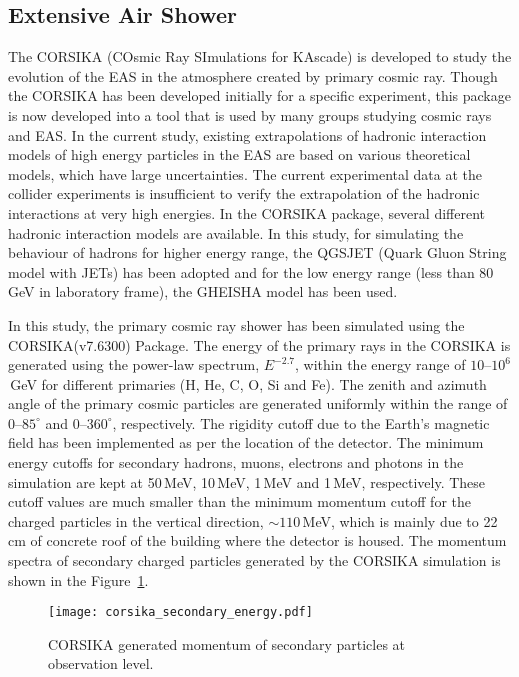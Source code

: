 \subsection{Extensive Air Shower}
The CORSIKA (COsmic Ray SImulations for KAscade) is developed to study
the evolution of the EAS in the atmosphere created by primary cosmic
ray. Though the CORSIKA has been developed initially for a specific
experiment, this package is now developed into a tool that is used
by many groups studying cosmic rays and EAS.
In the current study, existing extrapolations of hadronic interaction
models of high energy particles in the EAS are based on
various theoretical models, which have large uncertainties.
The current experimental data at the collider experiments is
insufficient to verify the extrapolation of the hadronic interactions
at very high energies. In the CORSIKA package, several different
hadronic interaction models are available. In this study, for
simulating the behaviour of hadrons for higher energy range,
the QGSJET (Quark Gluon String model with JETs)\cite{corsika763} has
been adopted and for the low energy range (less than 80\,GeV in
laboratory frame), the GHEISHA model has been used.

In this study, the primary cosmic ray shower has been simulated using
the CORSIKA(v7.6300) Package. The energy of the primary rays in the
CORSIKA is generated using the power-law spectrum, $E^{-2.7}$, within
the energy range of \mbox{$10$--$10^{6}$\,GeV} for different primaries
(H, He, C, O, Si and Fe). The zenith and azimuth angle of the primary
cosmic particles are generated uniformly within the range of
\mbox{$0$--$85^\circ$} and \mbox{$0$--$360^\circ$}, respectively. The
rigidity cutoff due to the Earth's magnetic field has been implemented
as per the location of the detector. The minimum energy cutoffs for
secondary hadrons, muons, electrons and photons in the simulation are
kept at 50\,MeV, 10\,MeV, 1\,MeV and 1\,MeV, respectively. These cutoff
values are much smaller than the minimum momentum cutoff for
the charged particles in the vertical direction,
\mbox{$\sim 110$\,MeV}, which is mainly due to 22\,cm of concrete
roof of the building where the detector is housed. The momentum
spectra of secondary charged particles generated by the CORSIKA
simulation is shown in the Figure~\ref{fig:momin}.
\begin{figure}[h]
  \centering
  \texttt{[image: corsika\_secondary\_energy.pdf]} 
  \caption{CORSIKA generated momentum of secondary particles at
    observation level.}
  \label{fig:momin}
\end{figure}

